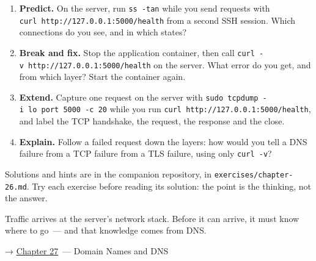 \begin{enumerate}
\def\labelenumi{\arabic{enumi}.}
\tightlist
\item
  \textbf{Predict.} On the server, run \texttt{ss\ -tan} while you send requests with \texttt{curl\ http:}\allowbreak{}\texttt{/}\allowbreak{}\texttt{/}\allowbreak{}\texttt{127.}\allowbreak{}\texttt{0.}\allowbreak{}\texttt{0.}\allowbreak{}\texttt{1:}\allowbreak{}\texttt{5000/}\allowbreak{}\texttt{health} from a second SSH session. Which connections do you see, and in which states?
\item
  \textbf{Break and fix.} Stop the application container, then call \texttt{curl\ -}\allowbreak{}\texttt{v\ http:}\allowbreak{}\texttt{/}\allowbreak{}\texttt{/}\allowbreak{}\texttt{127.}\allowbreak{}\texttt{0.}\allowbreak{}\texttt{0.}\allowbreak{}\texttt{1:}\allowbreak{}\texttt{5000/}\allowbreak{}\texttt{health} on the server. What error do you get, and from which layer? Start the container again.
\item
  \textbf{Extend.} Capture one request on the server with \texttt{sudo\ tcpdump\ -}\allowbreak{}\texttt{i\ lo\ port\ 5000\ -}\allowbreak{}\texttt{c\ 20} while you run \texttt{curl\ http:}\allowbreak{}\texttt{/}\allowbreak{}\texttt{/}\allowbreak{}\texttt{127.}\allowbreak{}\texttt{0.}\allowbreak{}\texttt{0.}\allowbreak{}\texttt{1:}\allowbreak{}\texttt{5000/}\allowbreak{}\texttt{health}, and label the TCP handshake, the request, the response and the close.
\item
  \textbf{Explain.} Follow a failed request down the layers: how would you tell a DNS failure from a TCP failure from a TLS failure, using only \texttt{curl\ -v}?
\end{enumerate}

\noindent{}Solutions and hints are in the companion repository, in \texttt{exercises/}\allowbreak{}\texttt{chapter-26.md}. Try each exercise before reading its solution: the point is the thinking, not the answer.

\label{26-network-stack-flow:whats-next}

Traffic arrives at the server's network stack. Before it can arrive, it must know where to go~--- and that knowledge comes from DNS.

\noindent{}→ \hyperref[ch:27-domain-and-dns]{Chapter 27}~--- Domain Names and DNS
